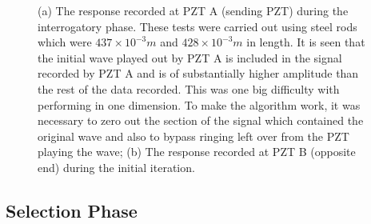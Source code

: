 \begin{figure}
\begin{subfigmatrix}{2}
\end{subfigmatrix}

  \caption[all]
  { \label{fig:initialPhaseRead}
(a) The response recorded at PZT A (sending PZT) during the interrogatory phase. These tests were carried out using steel rods which were $437 \times 10^{-3} m$ and $428 \times 10^{-3} m$ in length. It is seen that the initial wave played out by PZT A is included in the signal recorded by PZT A and is of substantially higher amplitude than the rest of the data recorded. This was one big difficulty with performing in one dimension. To make the algorithm work, it was necessary to zero out the section of the signal which contained the original wave and also to bypass ringing left over from the PZT playing the wave;
(b) The response recorded at PZT B (opposite end) during the initial iteration.
}
\end{figure}

\subsection{Selection Phase}


